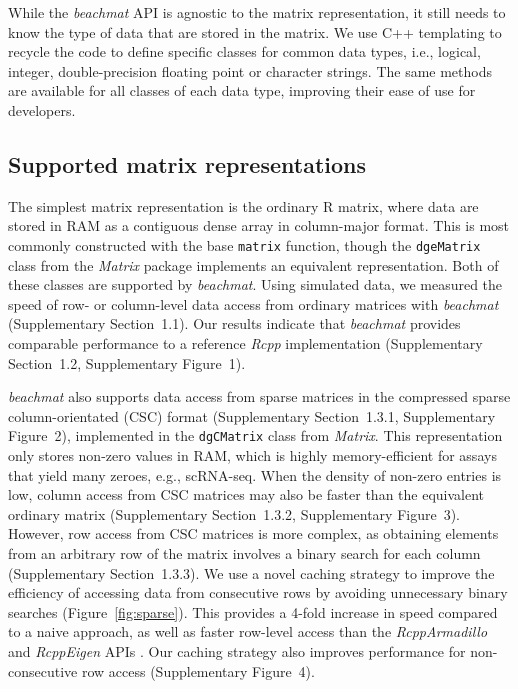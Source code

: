 \documentclass[10pt,letterpaper]{article}
\newcommand{\suppfigsimpleaccess}{1}
\newcommand{\suppfigsparseschem}{2}
\newcommand{\suppfigsparsecol}{3}
\newcommand{\suppfigsparserandom}{4}
\newcommand{\suppsecsimdesign}{1.1}
\newcommand{\suppsecsimple}{1.2}
\newcommand{\suppsecsparseschem}{1.3.1}
\newcommand{\suppsecsparsecol}{1.3.2}
\newcommand{\suppsecsparserow}{1.3.3}
\newcommand{\beachmat}{\textit{beachmat}}
\begin{document}
While the \beachmat{} API is agnostic to the matrix representation, it still needs to know the type of data that are stored in the matrix.
We use C++ templating to recycle the code to define specific classes for common data types, i.e., logical, integer, double-precision floating point or character strings.
The same methods are available for all classes of each data type, improving their ease of use for developers.

\subsection*{Supported matrix representations}
The simplest matrix representation is the ordinary R matrix, where data are stored in RAM as a contiguous dense array in column-major format.
This is most commonly constructed with the base \texttt{matrix} function, though the \texttt{dgeMatrix} class from the \textit{Matrix} package implements an equivalent representation.
Both of these classes are supported by \beachmat{}.
Using simulated data, we measured the speed of row- or column-level data access from ordinary matrices with \beachmat{} (Supplementary Section~\suppsecsimdesign{}). 
Our results indicate that \beachmat{} provides comparable performance to a reference \textit{Rcpp} implementation 
(Supplementary Section~\suppsecsimple{}, Supplementary Figure~\suppfigsimpleaccess{}). 

\beachmat{} also supports data access from sparse matrices in the compressed sparse column-orientated (CSC) format (Supplementary Section~\suppsecsparseschem{}, Supplementary Figure~\suppfigsparseschem{}), implemented in the \texttt{dgCMatrix} class from \textit{Matrix}.
This representation only stores non-zero values in RAM, which is highly memory-efficient for assays that yield many zeroes, e.g., scRNA-seq.
When the density of non-zero entries is low, column access from CSC matrices may also be faster than the equivalent ordinary matrix (Supplementary Section~\suppsecsparsecol{}, Supplementary Figure~\suppfigsparsecol{}).
However, row access from CSC matrices is more complex, as obtaining elements from an arbitrary row of the matrix involves a binary search for each column (Supplementary Section~\suppsecsparserow{}).
We use a novel caching strategy to improve the efficiency of accessing data from consecutive rows by avoiding unnecessary binary searches (Figure~\ref{fig:sparse}).
This provides a 4-fold increase in speed compared to a naive approach, as well as faster row-level access than the \textit{RcppArmadillo} and \textit{RcppEigen} APIs \cite{eddelbuettel2014arma,bates2013fast}.
Our caching strategy also improves performance for non-consecutive row access (Supplementary Figure~\suppfigsparserandom{}).
\end{document}

